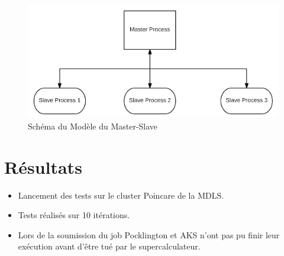 	
	\begin{frame}	
	\begin{figure}[!ht]	
		\begin{center}\includegraphics[scale=0.6]{Master1.png}\end{center}
		\caption{Schéma du Modèle du Master-Slave}
		\label{fg:Master}
	\end{figure}
	\end{frame}
	
	\section{Résultats}
	\begin{frame}
		\begin{itemize}
		\item Lancement des tests sur le cluster Poincare de la MDLS. \vspace{2em}
		\item Tests réalisés sur 10 itérations.\vspace{2em}
		\item Lors de la soumission du job Pocklington et AKS n'ont pas pu finir leur exécution avant d'être tué par le supercalculateur.\\
		\end{itemize}
	\end{frame}		
	
